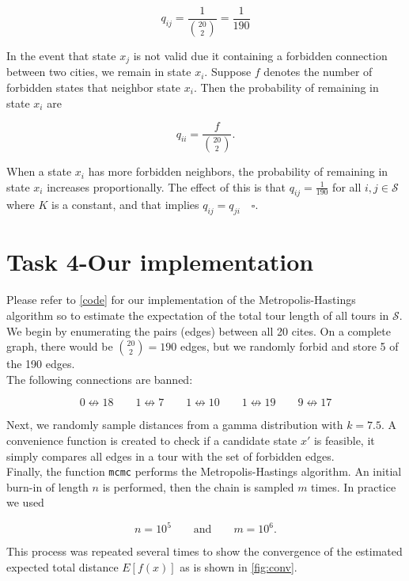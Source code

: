 \documentclass[6pt,oneside]{article}
\begin{document}
$$
q_{ij} = \frac{1}{\binom{20}{2}} = \frac{1}{190}
$$

In the event that state $x_j$ is not valid due it containing a forbidden connection between two cities,
we remain in state $x_i$. Suppose $f$ denotes the number of forbidden states that neighbor state
$x_i$. Then the probability of remaining in state $x_i$ are

$$
q_{ii} = \frac{f}{\binom{20}{2}}.
$$

When a state $x_i$ has more forbidden neighbors, the probability of remaining in state $x_i$ increases
proportionally. The effect of this is that $q_{ij} = \frac{1}{190}$ for all $i,j\in \mathcal{S}$ where $K$ is a constant,
and that implies $q_{ij} = q_{ji}\quad\square$.

\newpage

\section*{Task 4-Our implementation}

Please refer to \cref{code} for our implementation of the Metropolis-Hastings algorithm so to
estimate the expectation of the total tour length of all tours in $\mathcal{S}$.\\

We begin by enumerating the pairs (edges) between all 20 cites. On a complete graph,
there would be $\binom{20}{2}=190$ edges, but we randomly forbid and store 5 of the 190 edges.\\

The following connections are banned:

$$
0 \not\leftrightarrow 18
\quad\quad
1 \not\leftrightarrow 7
\quad\quad
1 \not\leftrightarrow 10
\quad\quad
1 \not\leftrightarrow 19
\quad\quad
9 \not\leftrightarrow 17
$$

Next, we randomly sample distances from a gamma distribution with $k=7.5$. A convenience function
is created to check if a candidate state $x'$ is feasible, it simply compares all edges in a tour
with the set of forbidden edges.\\

Finally, the function \texttt{mcmc} performs the Metropolis-Hastings algorithm. An initial
burn-in of length $n$ is performed, then the chain is sampled $m$ times. In practice we used

$$
n = 10^5\quad\quad\text{and}\quad\quad m = 10^6.
$$

This process was repeated several times to show the convergence of the estimated expected
total distance
$E\left[ f(x) \right]$ as is shown in \cref{fig:conv}.
\end{document}
